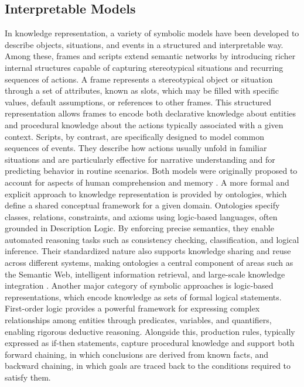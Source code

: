 \documentclass[12pt,a4paper]{report}
\begin{document}
\subsection{Interpretable Models}
In knowledge representation, a variety of symbolic models have been developed to describe objects, situations, and events in a structured and interpretable way. Among these, frames and scripts extend semantic networks by introducing richer internal structures capable of capturing stereotypical situations and recurring sequences of actions.
A frame represents a stereotypical object or situation through a set of attributes, known as slots, which may be filled with specific values, default assumptions, or references to other frames. This structured representation allows frames to encode both declarative knowledge about entities and procedural knowledge about the actions typically associated with a given context. Scripts, by contrast, are specifically designed to model common sequences of events. They describe how actions usually unfold in familiar situations and are particularly effective for narrative understanding and for predicting behavior in routine scenarios. Both models were originally proposed to account for aspects of human comprehension and memory \cite{chiave66}.
A more formal and explicit approach to knowledge representation is provided by ontologies, which define a shared conceptual framework for a given domain. Ontologies specify classes, relations, constraints, and axioms using logic-based languages, often grounded in Description Logic. By enforcing precise semantics, they enable automated reasoning tasks such as consistency checking, classification, and logical inference. Their standardized nature also supports knowledge sharing and reuse across different systems, making ontologies a central component of areas such as the Semantic Web, intelligent information retrieval, and large-scale knowledge integration  \cite{chiave67, chiave68}.
Another major category of symbolic approaches is logic-based representations, which encode knowledge as sets of formal logical statements. First-order logic provides a powerful framework for expressing complex relationships among entities through predicates, variables, and quantifiers, enabling rigorous deductive reasoning. Alongside this, production rules, typically expressed as if-then statements, capture procedural knowledge and support both forward chaining, in which conclusions are derived from known facts, and backward chaining, in which goals are traced back to the conditions required to satisfy them. 
\end{document}
